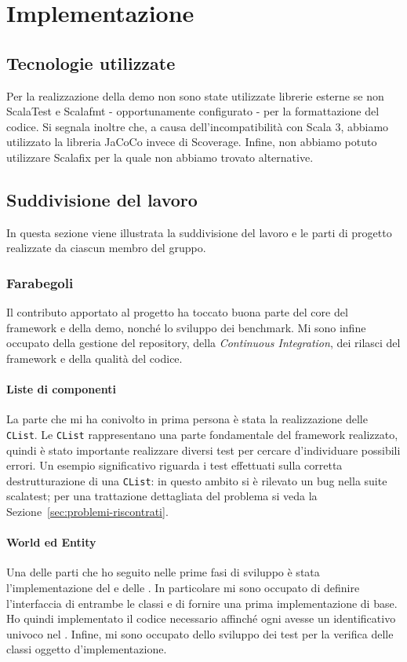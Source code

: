 \chapter{Implementazione}\label{ch:implementazione}

\section{Tecnologie utilizzate}\label{sec:tecnologie-utilizzate}
Per la realizzazione della demo non sono state utilizzate librerie esterne se non ScalaTest e
Scalafmt - opportunamente configurato - per la formattazione del codice.
Si segnala inoltre che, a causa dell'incompatibilità con Scala 3, abbiamo utilizzato la libreria JaCoCo invece di
Scoverage.
Infine, non abbiamo potuto utilizzare Scalafix per la quale non abbiamo trovato alternative.

\section{Suddivisione del lavoro}\label{sec:suddivisione-del-lavoro}
In questa sezione viene illustrata la suddivisione del lavoro e le parti di progetto realizzate da ciascun membro del
gruppo.

\subsection{Farabegoli}\label{subsec:farabegoli}
Il contributo apportato al progetto ha toccato buona parte del core del framework e della demo, nonché lo sviluppo
dei benchmark.
Mi sono infine occupato della gestione del repository, della \textit{Continuous Integration}, dei rilasci del framework
e della qualità del codice.

\subsubsection{Liste di componenti}
La parte che mi ha conivolto in prima persona è stata la realizzazione delle \texttt{CList}.
Le \texttt{CList} rappresentano una parte fondamentale del framework realizzato, quindi è stato importante realizzare
diversi test per cercare d'individuare possibili errori.
Un esempio significativo riguarda i test effettuati sulla corretta destrutturazione di una \texttt{CList}: in questo
ambito si è rilevato un bug nella suite scalatest;
per una trattazione dettagliata del problema si veda la Sezione~\ref{sec:problemi-riscontrati}.

\subsubsection{World ed Entity}
Una delle parti che ho seguito nelle prime fasi di sviluppo è stata l'implementazione del \World e delle \Entity.
In particolare mi sono occupato di definire l'interfaccia di entrambe le classi e di fornire una prima implementazione
di base.
Ho quindi implementato il codice necessario affinché ogni \Entity avesse un identificativo univoco nel \World.
Infine, mi sono occupato dello sviluppo dei test per la verifica delle classi oggetto d'implementazione.

